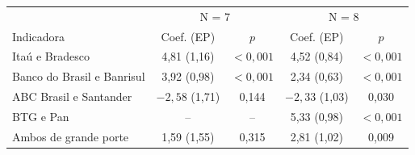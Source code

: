 \begin{tabular}{lcccc}
\toprule
 & \multicolumn{2}{c}{N = 7} & \multicolumn{2}{c}{N = 8} \\
Indicadora & Coef. (EP) & $p$ & Coef. (EP) & $p$ \\
\midrule
Itaú e Bradesco & 4,81 (1,16) & $<0{,}001$ & 4,52 (0,84) & $<0{,}001$ \\
Banco do Brasil e Banrisul & 3,92 (0,98) & $<0{,}001$ & 2,34 (0,63) & $<0{,}001$ \\
ABC Brasil e Santander & $-2{,}58$ (1,71) & 0,144 & $-2{,}33$ (1,03) & 0,030 \\
BTG e Pan & -- & -- & 5,33 (0,98) & $<0{,}001$ \\
Ambos de grande porte & 1,59 (1,55) & 0,315 & 2,81 (1,02) & 0,009 \\
\bottomrule
\end{tabular}
